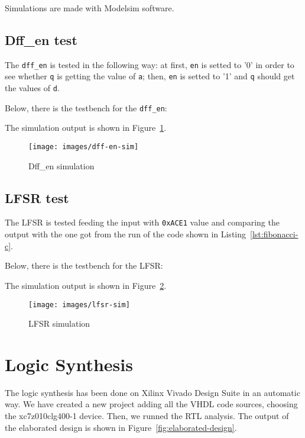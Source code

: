 \documentclass[11pt,a4paper,oneside, openright]{article}
\begin{document}
Simulations are made with Modelsim software.

\subsection{Dff\_en test}
The \texttt{dff\_en} is tested in the following way: at first, \texttt{en} is setted to '0' in order to see whether \texttt{q} is getting the value of \texttt{a}; then, \texttt{en} is setted to '1' and \texttt{q} should get the values of \texttt{d}.

Below, there is the testbench for the \texttt{dff\_en}:



The simulation output is shown in Figure~\ref{fig:dff-en-sim}.

\begin{figure}[h]
    \centering
    \texttt{[image: images/dff-en-sim]}
    \caption{Dff\_en simulation}
    \label{fig:dff-en-sim}
\end{figure}

\subsection{LFSR test}
The LFSR is tested feeding the input with \texttt{0xACE1} value and comparing the output with the one got from the run of the code shown in Listing~\ref{lst:fibonacci-c}.

Below, there is the testbench for the LFSR:



The simulation output is shown in Figure~\ref{fig:lfsr-sim}.

\begin{figure}[h]
    \centering
    \texttt{[image: images/lfsr-sim]}
    \caption{LFSR simulation}
    \label{fig:lfsr-sim}
\end{figure}

\newpage

\section{Logic Synthesis}
The logic synthesis has been done on Xilinx Vivado Design Suite in an automatic way. We have created a new project adding all the VHDL code sources, choosing the xc7z010clg400-1 device. Then, we runned the RTL analysis. The output of the elaborated design is shown in Figure~\ref{fig:elaborated-design}.
\end{document}
